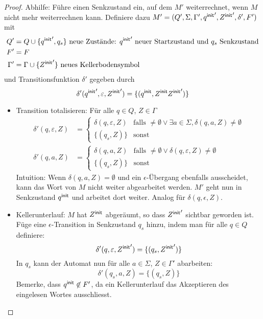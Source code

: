 {\begin{proof}
  Abhilfe: Führe einen Senkzustand ein, auf dem $M'$ weiterrechnet, wenn $M$ nicht mehr weiterrechnen kann. Definiere dazu $M' = (Q', \Sigma, \Gamma', {q^\mathsf{init}}', {Z^\mathsf{init}}', \delta', F')$ mit
  \begin{align*}
  Q' &= Q \cup \{{q^\mathsf{init}}', q_s\} \text{ neue Zustände: ${q^\mathsf{init}}'$ neuer Startzustand und $q_s$ Senkzustand} \\
  F' &= F \\
  \Gamma' &= \Gamma \cup \{{Z^\mathsf{init}}'\} \text{ neues Kellerbodensymbol}
  \end{align*}
  und Transitionsfunktion $\delta'$ gegeben durch
  \[\delta' ({q^\mathsf{init}}', \varepsilon, {Z^\mathsf{init}}') = \{ (q^\mathsf{init}, Z^\mathsf{init}{Z^\mathsf{init}}') \} \]
  \begin{itemize}
  \item Transition totalisieren: Für alle $q\in Q$, $Z \in \Gamma$\\
    \begin{align*}
      \delta' (q, \varepsilon, Z) &=
      \begin{cases}
        \delta (q, \varepsilon, Z) & \text{falls
        }\ne\emptyset\vee\exists a\in\Sigma, \delta (q, a, Z)\ne \emptyset \\
        \{ (q_s, Z) \} & \text{sonst}
      \end{cases} \\
      \delta' (q, a, Z) &=
      \begin{cases}
        \delta (q, a, Z) & \text{falls }\ne\emptyset\vee\delta (q,
        \varepsilon, Z) \ne \emptyset \\
        \{ (q_s, Z) \} & \text{sonst}
      \end{cases}
    \end{align*}
    Intuition: Wenn $\delta(q, a, Z) = \emptyset$ und ein $\epsilon$-Übergang ebenfalls ausscheidet, kann das Wort von $M$ nicht weiter abgearbeitet werden. $M'$ geht nun in Senkzustand $q^\mathsf{init}$ und arbeitet dort weiter. Analog für $\delta(q, \epsilon, Z)$.
  \item Kellerunterlauf: $M$ hat $Z^\mathsf{init}$ abgeräumt, so dass ${Z^\mathsf{init}}'$
    sichtbar geworden ist. Füge eine $\epsilon$-Transition in
     Senkzustand $q_s$ hinzu, indem man für alle $q\in Q$ definiere:\\
    \[\delta' (q, \varepsilon, {Z^\mathsf{init}}') = \{ (q_s, {Z^\mathsf{init}}') \} \]
  In $q_s$ kann der Automat nun für alle $a\in\Sigma$, $Z\in \Gamma'$ abarbeiten:\\
    \[\delta' (q_s, a, Z) = \{ (q_s, Z) \}\]   %
    Bemerke, dass $q^\mathsf{init} \not \in F'$, da ein Kellerunterlauf
    das Akzeptieren des eingelesen Wortes ausschliesst.
  \end{itemize}


\end{proof}}
